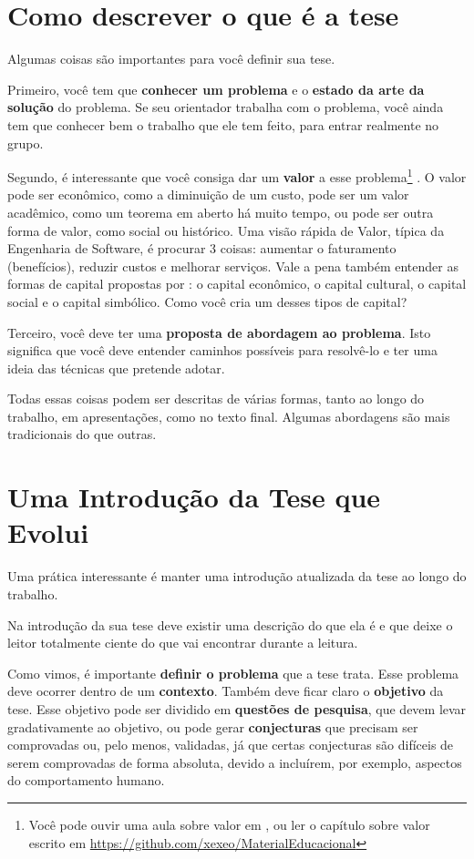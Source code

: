 \section{Como descrever o que é a tese}

Algumas coisas são importantes para você definir sua tese.

Primeiro, você tem que \textbf{conhecer um problema} e o \textbf{estado da arte da solução} do problema. Se seu orientador trabalha com o problema, você ainda tem que conhecer bem o trabalho que ele tem feito, para entrar realmente no grupo.

Segundo, é interessante que você consiga dar um \textbf{valor} a esse problema\footnote{Você pode ouvir uma aula sobre valor em , ou ler o capítulo sobre valor escrito em \url{https://github.com/xexeo/MaterialEducacional}} . O valor pode ser econômico, como a diminuição de um custo, pode ser um valor acadêmico, como um teorema em aberto há muito tempo, ou pode ser outra forma de valor, como social ou histórico. Uma visão rápida de Valor, típica da Engenharia de Software, é procurar 3 coisas: aumentar o faturamento (benefícios), reduzir custos e melhorar serviços. Vale a pena também entender as formas de capital propostas por \citet{bourdieu1986forms}: o capital econômico, o capital cultural, o capital social e o capital simbólico. Como você cria um desses tipos de capital?

Terceiro, você deve ter uma \textbf{proposta de abordagem ao problema}. Isto significa que você deve entender caminhos possíveis para resolvê-lo e ter uma ideia das técnicas que pretende adotar.

Todas essas coisas podem ser descritas de várias formas, tanto ao longo do trabalho, em apresentações, como no texto final. Algumas abordagens são mais tradicionais do que outras.

\section{Uma Introdução da Tese que Evolui}

Uma prática interessante é manter uma introdução atualizada da tese ao longo do trabalho. 

Na introdução da sua tese deve existir uma descrição do que ela é e que deixe o leitor totalmente ciente do que vai encontrar durante a leitura. 

Como vimos, é importante \textbf{definir o problema} que a tese trata. Esse problema deve ocorrer dentro de um \textbf{contexto}. Também deve ficar claro o \textbf{objetivo} da tese. Esse objetivo pode ser dividido em \textbf{questões de pesquisa}, que devem levar gradativamente ao objetivo, ou pode gerar \textbf{conjecturas} que precisam ser comprovadas ou, pelo menos, validadas, já que certas conjecturas são difíceis de serem comprovadas de forma absoluta, devido a incluírem, por exemplo, aspectos do comportamento humano.

